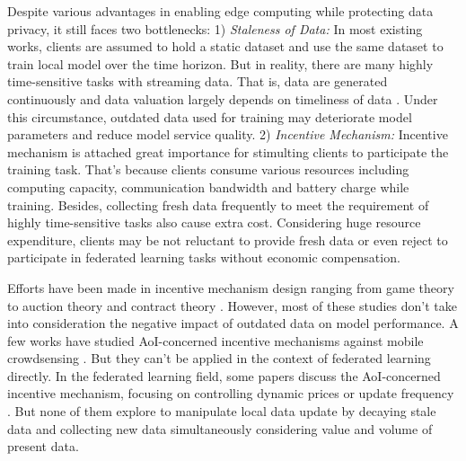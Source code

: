\documentclass{article}
\theoremstyle{plain}
\theoremstyle{definition}
\theoremstyle{remark}
\begin{document}
Despite various advantages in enabling edge computing while protecting data privacy, it still faces two bottlenecks:
1) \textit{Staleness of Data:} In most existing works, clients are assumed to hold a static dataset and use the same dataset to train local model over the time horizon.
But in reality, there are many highly time-sensitive tasks with streaming data. That is, data are generated continuously and data valuation largely depends on timeliness of data \cite{xiao2023aoi}.
Under this circumstance, outdated data used for training may deteriorate model parameters and reduce model service quality.
2) \textit{Incentive Mechanism:} Incentive mechanism is attached great importance for stimulting clients to participate the training task. That's because clients consume various resources including computing capacity, communication bandwidth and battery charge while training.
Besides, collecting fresh data frequently to meet the requirement of highly time-sensitive tasks also cause extra cost. Considering huge resource expenditure, clients may be not reluctant to provide fresh data or even reject to participate in federated learning tasks without economic compensation.

Efforts have been made in incentive mechanism design ranging from game theory \cite{lim2020hierarchical} \cite{zhang2022enabling} \cite{huang2024collaboration} to auction theory \cite{jiao2020toward} and contract theory \cite{kang2019incentive} \cite{ding2020optimal}. However, most of these studies don't take into consideration the negative impact of outdated data on model performance.
A few works have studied AoI-concerned incentive mechanisms against mobile crowdsensing \cite{xiao2023aoi} \cite{wang2021taming}. But they can't be applied in the context of federated learning directly.
In the federated learning field, some papers discuss the AoI-concerned incentive mechanism, focusing on controlling dynamic prices or update frequency \cite{wang2019dynamic} \cite{wu2023towards}. But none of them explore to manipulate local data update by decaying stale data and collecting new data simultaneously considering value and volume of present data. 
\end{document}
